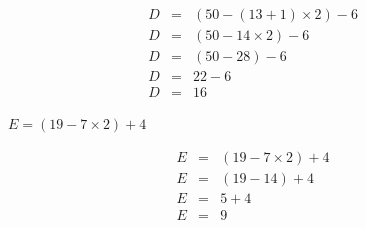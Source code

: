 \begin{questions}
		{\LARGE \begin{solution}
			\begin{eqnarray*}
			D &=&  (50 - (13 + 1) \times 2) - 6\\
			D &=&  (50 - 14 \times 2) - 6\\
			D &=& (50 - 28) - 6\\
			D &=& 22 - 6 \\
			D &=& 16 
			\end{eqnarray*}
		\end{solution}}
		
		{\LARGE \question[2]  $E = (19 - 7 \times 2) + 4$}
		
		{\LARGE \begin{solution}
			\begin{eqnarray*}
			E &=&  (19 - 7 \times 2) + 4\\
			E &=&  (19 - 14) + 4\\
			E &=& 5 + 4 \\
			E &=& 9 
			\end{eqnarray*}
		\end{solution}}
	\end{questions}
	
	
